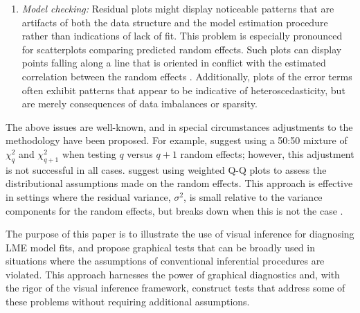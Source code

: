 \documentclass[12pt]{article} %
\newcommand{\hh}[1]{{\color{orange} #1}}
\newcommand{\alnote}[1]{\todo[inline,color=green!40]{#1}} %
\newcommand{\hhnote}[1]{\todo[inline,color=orange!40]{#1}}
\begin{document}
\begin{enumerate}
\item {\em Model checking:} Residual plots might display noticeable patterns that are artifacts of both the data structure and the model estimation procedure rather than indications of lack of fit. 
This problem is especially pronounced for  scatterplots comparing predicted random effects. Such plots can display points falling along a line that is oriented in conflict with the estimated correlation between the random effects \cite[see][for an example]{Morrell:2000ve}. 
Additionally,  plots of the error terms often exhibit patterns that appear to be indicative of heteroscedasticity, but are merely consequences of data imbalances or sparsity.

\end{enumerate}

The above issues are well-known, and in special circumstances adjustments to the methodology have been proposed. For example, \cite{Stram:1994wd} suggest using a 50:50 mixture of $\chi^2_q$ and $\chi^2_{q+1}$ when testing $q$ versus $q + 1$ random effects; however, this adjustment is not successful in all cases.  \cite{Lange:1989uu} suggest using weighted Q-Q plots to assess the distributional assumptions made on the random effects. This approach is effective in settings where the residual variance, $\sigma^2$, is small relative to the variance components for the random effects, but breaks down when this is not the case \citep{adam}.
 



The purpose of this paper is to illustrate the use of visual inference for diagnosing LME model fits, and propose graphical tests that can be broadly used in situations where the assumptions of conventional inferential procedures are violated. This approach harnesses the power of graphical diagnostics and, with the rigor of the visual inference framework, construct tests that address some of these problems without requiring additional assumptions. 
\end{document}
